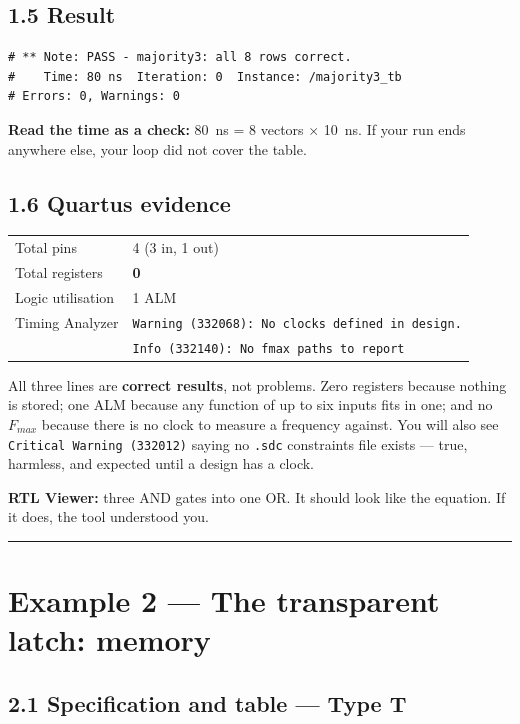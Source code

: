 \documentclass[11pt]{article}
\newcommand{\code}[1]{\texttt{#1}}
\newcommand{\hr}{\vspace{2pt}\hrule\vspace{6pt}}
\begin{document}
\subsection*{1.5 Result}

\begin{lstlisting}
# ** Note: PASS - majority3: all 8 rows correct.
#    Time: 80 ns  Iteration: 0  Instance: /majority3_tb
# Errors: 0, Warnings: 0
\end{lstlisting}

\textbf{Read the time as a check:} 80~ns = 8 vectors $\times$ 10~ns. If your run ends
anywhere else, your loop did not cover the table.

\subsection*{1.6 Quartus evidence}

\begin{center}
\begin{tabular}{ll}
\toprule
Total pins & 4 \quad (3 in, 1 out) \\
Total registers & \textbf{0} \\
Logic utilisation & 1 ALM \\
Timing Analyzer & \code{Warning (332068): No clocks defined in design.} \\
& \code{Info (332140): No fmax paths to report} \\
\bottomrule
\end{tabular}
\end{center}

All three lines are \textbf{correct results}, not problems. Zero registers because
nothing is stored; one ALM because any function of up to six inputs fits in one; and
no $F_{max}$ because there is no clock to measure a frequency against. You will also
see \code{Critical Warning (332012)} saying no \code{.sdc} constraints file exists ---
true, harmless, and expected until a design has a clock.

\textbf{RTL Viewer:} three AND gates into one OR. It should look like the equation.
If it does, the tool understood you.

\vspace{4pt}\hr

\section*{Example 2 --- The transparent latch: memory}

\subsection*{2.1 Specification and table --- Type T}
\end{document}
